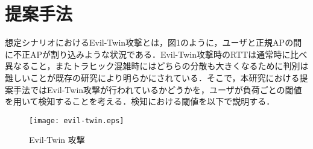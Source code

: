 \documentclass[twocolumn, a4paper]{ieicejsp}
\begin{document}
\section{提案手法}
想定シナリオにおけるEvil-Twin攻撃とは，図1のように，ユーザと正規APの間に不正APが割り込みような状況である．Evil-Twin攻撃時のRTTは通常時に比べ異なること，またトラヒック混雑時にはどちらの分散も大きくなるために判別は難しいことが既存の研究\cite{9405821}により明らかにされている．そこで，本研究における提案手法ではEvil-Twin攻撃が行われているかどうかを，ユーザが負荷ごとの閾値を用いて検知することを考える．検知における閾値を以下で説明する．\par
\par

\begin{figure}[b]
  \centering
  \texttt{[image: evil-twin.eps]}
  \caption{Evil-Twin 攻撃}
\label{fig_PowerConsumption}
\end{figure}
\end{document}
